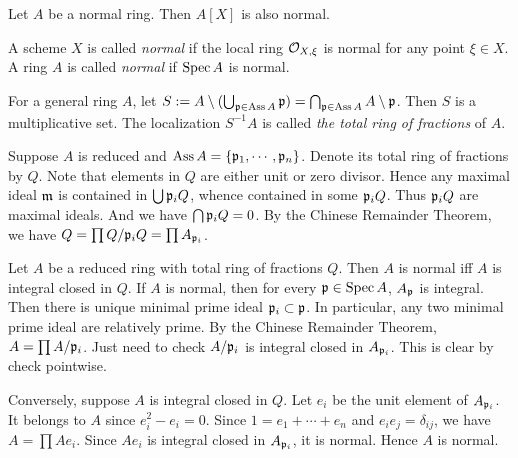     \begin{proposition}
        Let $A$ be a normal ring.
        Then $A[X]$ is also normal.
    \end{proposition}

    \begin{definition}\label{def: normal of scheme and general ring}
        A scheme $X$ is called \textit{normal} if the local ring ${\mathcal{O}}_{X,\xi}$ is normal for any point $\xi \in X$.
        A ring $A$ is called \textit{normal} if $\operatorname{Spec} A$ is normal.
    \end{definition}

    \begin{remark}\label{rmk: total ring of fractions and normality of general reduced ring}
        For a general ring $A$, let $S := A\setminus (\bigcup_{{\mathfrak{p}} \in \operatorname{Ass} A} {\mathfrak{p}}) = \bigcap_{{\mathfrak{p}} \in \operatorname{Ass} A}A\setminus {\mathfrak{p}}$.
        Then $S$ is a multiplicative set.
        The localization $S^{-1}A$ is called \textit{the total ring of fractions} of $A$.
        
        Suppose $A$ is reduced and $\operatorname{Ass} A = \{{\mathfrak{p}}_1,\cdots,{\mathfrak{p}}_n\}$.
        Denote its total ring of fractions by $Q$.
        Note that elements in $Q$ are either unit or zero divisor.
        Hence any maximal ideal ${\mathfrak{m}}$ is contained in $\bigcup {\mathfrak{p}}_iQ$, whence contained in some ${\mathfrak{p}}_i Q$.
        Thus ${\mathfrak{p}}_i Q$ are maximal ideals.
        And we have $\bigcap {\mathfrak{p}}_i Q = 0$. 
        By the Chinese Remainder Theorem, we have $Q = \prod Q/{{\mathfrak{p}}_i}Q = \prod A_{{\mathfrak{p}}_i}$.
        
        Let $A$ be a reduced ring with total ring of fractions $Q$.
        Then $A$ is normal iff $A$ is integral closed in $Q$.
        If $A$ is normal, then for every ${\mathfrak{p}} \in \operatorname{Spec} A$, $A_{\mathfrak{p}}$ is integral.
        Then there is unique minimal prime ideal ${\mathfrak{p}}_i \subset {\mathfrak{p}}$.
        In particular, any two minimal prime ideal are relatively prime.
        By the Chinese Remainder Theorem, $A = \prod A/{\mathfrak{p}}_i$.
        Just need to check $A/{\mathfrak{p}}_i$ is integral closed in $A_{{\mathfrak{p}}_i}$.
        This is clear by check pointwise.

        Conversely, suppose $A$ is integral closed in $Q$.
        Let $e_i$ be the unit element of $A_{{\mathfrak{p}}_i}$.
        It belongs to $A$ since $e_i^2 - e_i = 0$.
        Since $1 = e_1 + \cdots + e_n$ and $e_ie_j = \delta_{ij}$, we have $A = \prod Ae_i$.
        Since $Ae_i$ is integral closed in $A_{{\mathfrak{p}}_i}$, it is normal.
        Hence $A$ is normal.
    \end{remark}

